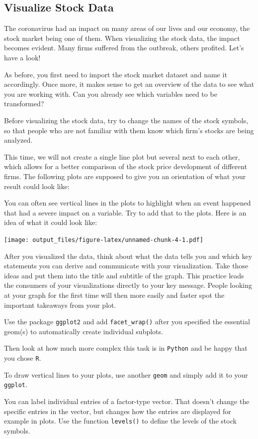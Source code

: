 \documentclass[
  11pt,
]{article}
\newenvironment{tips}[1]
  {
  \begin{itemize}
  \footnotesize
  \renewcommand{\labelitemi}{
    \raisebox{-.7\height}[0pt][0pt]{
      {\setkeys{Gin}{width=3em,keepaspectratio}
        \texttt{[image: images/\#1.png]}}
    }
  }
  \setlength{\fboxsep}{1em}
  \begin{rbox}
  \item
  }
  {
  \end{rbox}
  \end{itemize}
  }
\begin{document}
\hypertarget{visualize-stock-data}{%
\subsection{Visualize Stock Data}\label{visualize-stock-data}}

The coronavirus had an impact on many areas of our lives and our economy, the stock market being one of them. When visualizing the stock data, the impact becomes evident. Many firms suffered from the outbreak, others profited. Let's have a look!

As before, you first need to import the stock market dataset and name it accordingly. Once more, it makes sense to get an overview of the data to see what you are working with. Can you already see which variables need to be transformed?

Before visualizing the stock data, try to change the names of the stock symbols, so that people who are not familiar with them know which firm's stocks are being analyzed.

This time, we will not create a single line plot but several next to each other, which allows for a better comparison of the stock price development of different firms. The following plots are supposed to give you an orientation of what your result could look like:

You can often see vertical lines in the plots to highlight when an event happened that had a severe impact on a variable. Try to add that to the plots. Here is an idea of what it could look like:

\texttt{[image: output\_files/figure-latex/unnamed-chunk-4-1.pdf]}

After you visualized the data, think about what the data tells you and which key statements you can derive and communicate with your visualization. Take those ideas and put them into the title and subtitle of the graph. This practice leads the consumers of your visualizations directly to your key message. People looking at your graph for the first time will then more easily and faster spot the important takeaways from your plot.

\begin{tips}r

Use the package \texttt{ggplot2} and add \texttt{facet\_wrap()} after you specified the essential geom(s) to automatically create individual subplots.

Then look at how much more complex this task is in \texttt{Python} and be happy that you chose \texttt{R}.

To draw vertical lines to your plots, use another \texttt{geom} and simply add it to your \texttt{ggplot}.

You can label individual entries of a factor-type vector. That doesn't change the specific entries in the vector, but changes how the entries are displayed for example in plots. Use the function \texttt{levels()} to define the levels of the stock symbols.

\end{tips}
\end{document}
